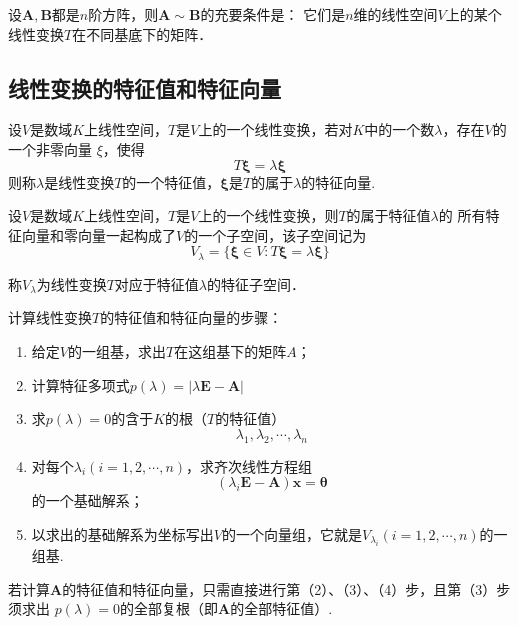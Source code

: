     \begin{theorem}
        设$\boldsymbol{A},\boldsymbol{B}$都是$n$阶方阵，则$\boldsymbol{A}\sim \boldsymbol{B}$的充要条件是：
        它们是$n$维的线性空间$V$上的某个线性变换$T$在不同基底下的矩阵．
    \end{theorem}


\subsection{线性变换的特征值和特征向量}
    \begin{definition}[线性变换的特征值与特征向量]
        设$V$是数域$K$上线性空间，$T$是$V$上的一个线性变换，若对$K$中的一个数$\lambda$，存在$V$的一个非零向量
        $\xi$，使得$$T\boldsymbol{\xi}=\lambda\boldsymbol{\xi}$$
        则称$\lambda$是线性变换$T$的一个{\heiti 特征值}，$\boldsymbol{\xi}$是$T$的属于$\lambda$的{\heiti 特征向量}.
    \end{definition}

    \begin{theorem}
        设$V$是数域$K$上线性空间，$T$是$V$上的一个线性变换，则$T$的属于特征值$\lambda$的
        所有特征向量和零向量一起构成了$V$的一个子空间，该子空间记为
        $$V_{\lambda}=\{\boldsymbol{\xi}\in V:T\boldsymbol{\xi}=\lambda\boldsymbol{\xi}\}$$
    \end{theorem}

    \begin{definition}[特征子空间]
        称$V_\lambda$为线性变换$T$对应于特征值$\lambda$的{\heiti 特征子空间}．
    \end{definition}

    \begin{theorem}
        计算线性变换$T$的特征值和特征向量的步骤：
        \begin{enumerate}[(1)]
            \item 给定$V$的一组基，求出$T$在这组基下的矩阵$A$；
            \item 计算特征多项式$p(\lambda)=|\lambda\boldsymbol{E}-\boldsymbol{A}|$
            \item 求$p(\lambda)=0$的含于$K$的根（$T$的特征值）$$\lambda_1,\lambda_2,\cdots,\lambda_n$$
            \item 对每个$\lambda_i(i=1,2,\cdots,n)$，求齐次线性方程组$$(\lambda_i\boldsymbol{E}-\boldsymbol{A})\boldsymbol{x}=\boldsymbol{\theta}$$的一个基础解系；
            \item 以求出的基础解系为坐标写出$V$的一个向量组，它就是$V_{\lambda_i}(i=1,2,\cdots,n)$的一组基.
        \end{enumerate}

        若计算$\boldsymbol{A}$的特征值和特征向量，只需直接进行第（2）、（3）、（4）步，且第（3）步须求出
        $p(\lambda)=0$的全部复根（即$\boldsymbol{A}$的全部特征值）.
    \end{theorem}

